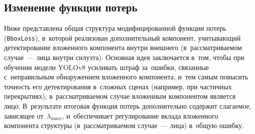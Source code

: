 \subsection{Изменение функции потерь}\label{sec:ch3/loss}

Ниже представлена общая структура модифицированной функции потерь
(\texttt{BboxLoss}), в~которой реализован дополнительный компонент,
учитывающий детектирование вложенного компонента внутри внешнего (в~рассматриваемом случае~--- лица внутри силуэта). Основная идея заключается
в~том, чтобы при обучении модели YOLOv8 усиливать штраф за~ошибки,
связанные с~неправильным обнаружением вложенного компонента, и~тем самым повысить
точность его детектирования в~сложных сценах (например, при частичных
перекрытиях); в~рассматриваемом случае вложенным компонентом является лицо. В~результате итоговая функция потерь дополнительно
содержит слагаемое, зависящее от~$\lambda_{\text{inner}}$, и~обеспечивает
регулирование вклада вложенного компонента структуры (в~рассматриваемом случае~--- лица) в~общую ошибку.

